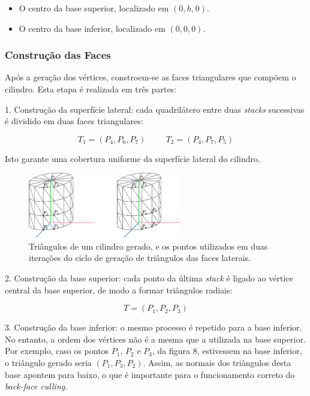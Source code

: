 \documentclass[12pt, a4paper]{article}
\begin{document}
\begin{itemize}
    \item O centro da base superior, localizado em $(0, h, 0)$.
    \item O centro da base inferior, localizado em $(0, 0, 0)$.
\end{itemize}

\subsubsection{Construção das Faces}

Após a geração dos vértices, constroem-se as faces triangulares que compõem o cilindro. Esta etapa
é realizada em três partes:

1. Construção da superfície lateral: cada quadrilátero entre duas \emph{stacks} sucessivas é
dividido em duas faces triangulares:

$$
T_1 = (P_4, P_6, P_7)
\hspace{1cm}
T_2 = (P_4, P_7, P_5)
$$

Isto garante uma cobertura uniforme da superfície lateral do cilindro.

\begin{figure}[H]
    \centering
    \includegraphics[width=0.6\textwidth]{res/figures/cylinder.pdf}
    \caption{
        \onehalfspacing
        Triângulos de um cilindro gerado, e os pontos utilizados em duas iterações do ciclo de
        geração de triângulos das faces laterais.
    }
\end{figure}

2. Construção da base superior: cada ponto da última \emph{stack} é ligado ao vértice central da
base superior, de modo a formar triângulos radiais:

$$
T = (P_1, P_2, P_3)
$$

3. Construção da base inferior: o mesmo processo é repetido para a base inferior. No entanto, a
ordem dos vértices não é a mesma que a utilizada na base superior. Por exemplo, caso os pontos
$P_1$, $P_2$ e $P_3$, da figura 8, estivessem na base inferior, o triângulo gerado seria
$(P_1, P_3, P_2)$. Assim, as normais dos triângulos desta base apontem para baixo, o que é
importante para o funcionamento correto do \emph{back-face culling}.
\end{document}
